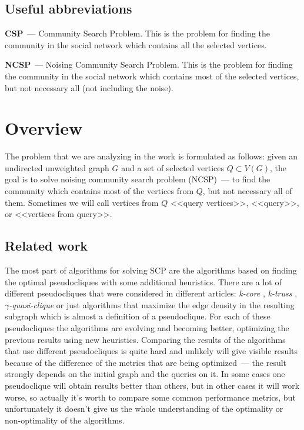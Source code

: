 \subsection{Useful abbreviations}

\textbf{CSP}~--- Community Search Problem. This is the problem for finding the community in the social network which contains all the selected vertices.

\textbf{NCSP}~--- Noising Community Search Problem. This is the problem for finding the community in the social network which contains most of the selected vertices, but not necessary all (not including the noise).

\section{Overview}

The problem that we are analyzing in the work is formulated as follows: given an undirected unweighted graph $G$ and a set of selected vertices $Q \subset V(G)$, the goal is to solve noising community search problem (NCSP)~--- to find the community which contains most of the vertices from $Q$, but not necessary all of them. Sometimes we will call vertices from $Q$ <<query vertices>>, <<query>>, or <<vertices from query>>.

\subsection{Related work}

The most part of algorithms for solving SCP are the algorithms based on finding the optimal pseudocliques with some additional heuristics. There are a lot of different pseudocliques that were considered in different articles: \textit{k-core} \cite{Barbieri15}, \textit{k-truss} \cite{Huang15}, \textit{$\gamma$-quasi-clique} \cite{Zhu11} or just algorithms that maximize the edge density in the resulting subgraph \cite{Wu15} which is almost a definition of a pseudoclique. For each of these pseudocliques the algorithms are evolving and becoming better, optimizing the previous results using new heuristics. Comparing the results of the algorithms that use different pseudocliques is quite hard and unlikely will give visible results because of the difference of the metrics that are being optimized~--- the result strongly depends on the initial graph and the queries on it. In some cases one pseudoclique will obtain results better than others, but in other cases it will work worse, so actually it's worth to compare some common performance metrics, but unfortunately it doesn't give us the whole understanding of the optimality or non-optimality of the algorithms.

